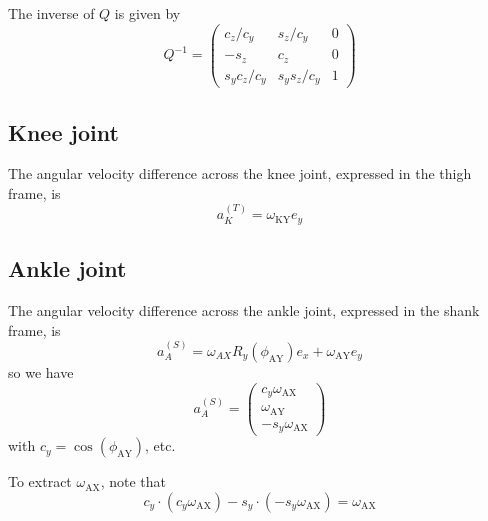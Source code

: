 \documentclass[a4paper]{article}
\begin{document}
The inverse of $Q$ is given by
\begin{equation}
Q^{-1} = \left(\begin{array}{ccc}
c_z/c_y & s_z/c_y & 0\\
-s_z & c_z & 0\\
s_y c_z / c_y & s_y s_z / c_y & 1
\end{array}\right)
\end{equation}

\subsection{Knee joint}
The angular velocity difference across the knee joint, expressed in the thigh frame, is
\begin{equation}
a_K^{(T)} = \omega_\mathrm{KY} e_y
\end{equation}

\subsection{Ankle joint}
The angular velocity difference across the ankle joint, expressed in the shank frame, is
\begin{equation}
a_A^{(S)} = \omega_{AX} R_y(\phi_\mathrm{AY}) e_x + \omega_\mathrm{AY} e_y
\end{equation}
so we have
\begin{equation}
a_A^{(S)} = \left( \begin{array}{c}
c_y \omega_\mathrm{AX}\\ \omega_\mathrm{AY}\\ -s_y \omega_\mathrm{AX}
\end{array}\right)
\end{equation}
with $c_y = \cos(\phi_\mathrm{AY})$, etc.

To extract $\omega_\mathrm{AX}$, note that
\begin{equation}
c_y \cdot (c_y \omega_\mathrm{AX}) - s_y \cdot(-s_y \omega_\mathrm{AX}) = \omega_\mathrm{AX}
\end{equation}
\end{document}
